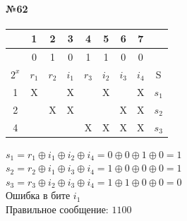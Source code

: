 \documentclass[12pt,onecolumn]{article}
\begin{document}
\begin{flushleft}
\paragraph{№62}
\hfill \break
\FloatBarrier
\begin{table}[h!]
  \begin{tabular}{|c|c|c|c|c|c|c|c|c|}

  \hline
                       & 1                         & 2                         & 3                         & 4                         & 5                         & 6                         & 7                         &      \\ \hline
                       & 0                         & 1                         & 0                         & 1                         & 1                         & 0                         & 0                         &      \\ \hline
  $2^x$ & $r_1$                             & $r_2$                      & $i_1$                      & $r_3$                     & $i_2$                      & $i_3$                      & $i_4$                      & S    \\ \hline
  1                    & \cellcolor[HTML]{32CB00}X &                           & \cellcolor[HTML]{32CB00}X &                           & \cellcolor[HTML]{32CB00}X &                           & \cellcolor[HTML]{32CB00}X & $s_1$ \\ \hline
  2                    &                           & \cellcolor[HTML]{34CDF9}X & \cellcolor[HTML]{34CDF9}X &                           &                           & \cellcolor[HTML]{34CDF9}X & \cellcolor[HTML]{34CDF9}X & $s_2$ \\ \hline
  4                    &                           &                           &                           & \cellcolor[HTML]{FFCC67}X & \cellcolor[HTML]{FFCC67}X & \cellcolor[HTML]{FFCC67}X & \cellcolor[HTML]{FFCC67}X & $s_3$ \\ \hline
  \end{tabular}
\end{table}
$s_1 = r_1\oplus i_1 \oplus i_2 \oplus i_4 = 0 \oplus 0 \oplus 1 \oplus 0 = 1 $\\
$s_2 = r_2\oplus i_1 \oplus i_3 \oplus i_4 = 1 \oplus 0 \oplus 0 \oplus 0 = 1 $\\
$s_3 = r_3\oplus i_2 \oplus i_3 \oplus i_4 = 1 \oplus 1 \oplus 0 \oplus 0 = 0 $\\
Ошибка в бите $i_1$\\
Правильное сообщение: $1100$

\end{flushleft}
\end{document}
